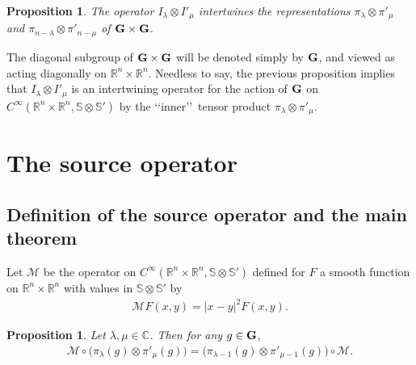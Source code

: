 \documentclass[pdftex]{sigma}
\numberwithin{equation}{section}
\newtheorem{prop}[theor]{Proposition}
\begin{document}
\begin{prop}
The operator $I_\lambda \otimes I'_\mu$ intertwines the representations $\pi_\lambda \otimes \pi'_\mu$ and $\pi_{n-\lambda} \otimes \pi'_{n-\mu}$ of $\bf G\times \bf G$.
\end{prop}
The diagonal subgroup of $\bf G \times \bf G$ will be denoted simply by $\bf G$, and viewed as acting diagonally on $\mathbb R^n\times \mathbb R^n$. Needless to say, the previous proposition implies that $I_\lambda \otimes I'_\mu$ is an intertwining operator for the action of $\bf G$ on $C^\infty(\mathbb R^n\times \mathbb R^n, \mathbb S\otimes\mathbb S')$ by the \lq\lq inner\rq\rq\ tensor product $\pi_\lambda\otimes \pi'_\mu$.

\section{The source operator}

\subsection{Definition of the source operator and the main theorem}

Let $\mathcal M$ be the operator on $C^\infty(\mathbb R^n\times \mathbb R^n, \mathbb S\otimes\mathbb S')$ defined for $F$ a smooth function on $\mathbb R^n\times \mathbb R^n$ with values in $\mathbb S\otimes \mathbb S'$ by
\begin{gather*}
\mathcal{M} F(x,y) = \vert x-y\vert^2 F(x,y) .
\end{gather*}

\begin{prop} \label{covM}
 Let $\lambda, \mu\in \mathbb C$. Then for any $g\in \bf G$,
 \begin{gather*}
 \mathcal{M} \circ\big(\pi_\lambda(g) \otimes \pi'_\mu(g)\big) = \big(\pi_{\lambda-1}(g)\otimes \pi'_{\mu-1}(g)\big)\circ \mathcal{M} .
 \end{gather*}
\end{prop}
\end{document}
